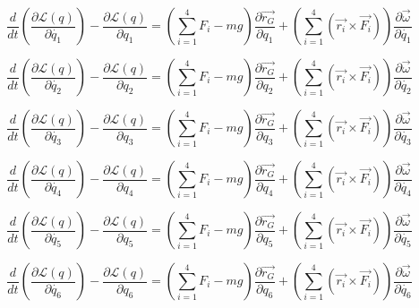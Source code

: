 \documentclass{article}
\begin{document}
\begin{equation}
\frac{d}{dt}(\frac{\partial\mathcal{L}(q)}{\partial\dot{q_{1}}}) - \frac{\partial\mathcal{L}(q)}{\partial q_{1}}= (\sum_{i=1}^{4}F_{i} - mg)\frac{\partial\overrightarrow{r_{G}}}{\partial q_{1}}+(\sum_{i=1}^{4}(\overrightarrow{r_{i}}\times\overrightarrow{F_{i}}))\frac{\partial\overrightarrow{\omega}}{\partial\dot{q_{1}}}
\end{equation}

\begin{equation}
\frac{d}{dt}(\frac{\partial\mathcal{L}(q)}{\partial\dot{q_{2}}}) - \frac{\partial\mathcal{L}(q)}{\partial q_{2}}= (\sum_{i=1}^{4}F_{i} - mg)\frac{\partial\overrightarrow{r_{G}}}{\partial q_{2}}+(\sum_{i=1}^{4}(\overrightarrow{r_{i}}\times\overrightarrow{F_{i}}))\frac{\partial\overrightarrow{\omega}}{\partial\dot{q_{2}}}
\end{equation}

\begin{equation}
\frac{d}{dt}(\frac{\partial\mathcal{L}(q)}{\partial\dot{q_{3}}}) - \frac{\partial\mathcal{L}(q)}{\partial q_{3}}= (\sum_{i=1}^{4}F_{i} - mg)\frac{\partial\overrightarrow{r_{G}}}{\partial q_{3}}+(\sum_{i=1}^{4}(\overrightarrow{r_{i}}\times\overrightarrow{F_{i}}))\frac{\partial\overrightarrow{\omega}}{\partial
\dot{q_{3}}}
\end{equation}

\begin{equation}
\frac{d}{dt}(\frac{\partial\mathcal{L}(q)}{\partial\dot{q_{4}}}) - \frac{\partial\mathcal{L}(q)}{\partial q_{4}}= (\sum_{i=1}^{4}F_{i} - mg)\frac{\partial\overrightarrow{r_{G}}}{\partial q_{4}}+(\sum_{i=1}^{4}(\overrightarrow{r_{i}}\times\overrightarrow{F_{i}}))\frac{\partial\overrightarrow{\omega}}{\partial\dot{q_{4}}}
\end{equation}

\begin{equation}
\frac{d}{dt}(\frac{\partial\mathcal{L}(q)}{\partial\dot{q_{5}}})- \frac{\partial\mathcal{L}(q)}{\partial q_{5}}= (\sum_{i=1}^{4}F_{i} - mg)\frac{\partial\overrightarrow{r_{G}}}{\partial q_{5}}+(\sum_{i=1}^{4}(\overrightarrow{r_{i}}\times\overrightarrow{F_{i}}))\frac{\partial\overrightarrow{\omega}}{\partial\dot{q_{5}}}
\end{equation}

\begin{equation}
\frac{d}{dt}(\frac{\partial\mathcal{L}(q)}{\partial\dot{q_{6}}}) - \frac{\partial\mathcal{L}(q)}{\partial q_{6}}= (\sum_{i=1}^{4}F_{i} - mg)\frac{\partial\overrightarrow{r_{G}}}{\partial q_{6}}+(\sum_{i=1}^{4}(\overrightarrow{r_{i}}\times\overrightarrow{F_{i}}))\frac{\partial\overrightarrow{\omega}}{\partial\dot{q_{6}}}
\end{equation}
\end{document}
